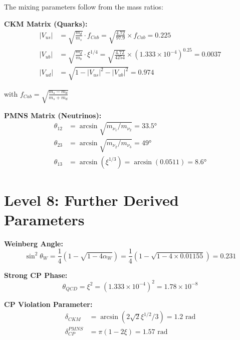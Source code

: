 \documentclass[12pt,a4paper]{article}
\newcommand{\xipar}{\xi}
\newcommand{\alphaw}{\alpha_W}
\begin{document}
	\begin{derived}
		The mixing parameters follow from the mass ratios:
		
		\textbf{CKM Matrix (Quarks):}
		\begin{align}
			|V_{us}| &= \sqrt{\frac{m_d}{m_s}} \cdot f_{Cab} = \sqrt{\frac{4.72}{97.9}} \times f_{Cab} = 0.225 \\
			|V_{ub}| &= \sqrt{\frac{m_d}{m_b}} \cdot \xipar^{1/4} = \sqrt{\frac{4.72}{4254}} \times (1.333 \times 10^{-4})^{0.25} = 0.0037 \\
			|V_{ud}| &= \sqrt{1 - |V_{us}|^2 - |V_{ub}|^2} = 0.974
		\end{align}
		
		with $f_{Cab} = \sqrt{\frac{m_s - m_d}{m_s + m_d}}$
		
		\textbf{PMNS Matrix (Neutrinos):}
		\begin{align}
			\theta_{12} &= \arcsin\sqrt{m_{\nu_1}/m_{\nu_2}} = 33.5° \\
			\theta_{23} &= \arcsin\sqrt{m_{\nu_2}/m_{\nu_3}} = 49° \\
			\theta_{13} &= \arcsin(\xipar^{1/3}) = \arcsin(0.0511) = 8.6°
		\end{align}
	\end{derived}
	
	\section{Level 8: Further Derived Parameters}
	
	\begin{derived}
		\textbf{Weinberg Angle:}
		\begin{equation}
			\sin^2\theta_W = \frac{1}{4}(1-\sqrt{1-4\alphaw}) = \frac{1}{4}(1-\sqrt{1-4 \times 0.01155}) = 0.231
		\end{equation}
		
		\textbf{Strong CP Phase:}
		\begin{equation}
			\theta_{QCD} = \xipar^{2} = (1.333 \times 10^{-4})^2 = 1.78 \times 10^{-8}
		\end{equation}
		
		\textbf{CP Violation Parameter:}
		\begin{align}
			\delta_{CKM} &= \arcsin(2\sqrt{2}\xipar^{1/2}/3) = 1.2 \text{ rad} \\
			\delta_{CP}^{PMNS} &= \pi(1 - 2\xipar) = 1.57 \text{ rad}
		\end{align}
	\end{derived}
	
\end{document}
